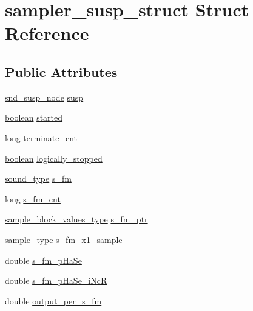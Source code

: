\hypertarget{structsampler__susp__struct}{}\section{sampler\+\_\+susp\+\_\+struct Struct Reference}
\label{structsampler__susp__struct}
\subsection*{Public Attributes}
\begin{DoxyCompactItemize}
\item 
\hyperlink{sound_8h_a6b268203688a934bd798ceb55f85d4c0}{snd\+\_\+susp\+\_\+node} \hyperlink{structsampler__susp__struct_aca12395994eb3e4a8d3e45013c46b4d1}{susp}
\item 
\hyperlink{cext_8h_a7670a4e8a07d9ebb00411948b0bbf86d}{boolean} \hyperlink{structsampler__susp__struct_a9e49593b1b9354e86921883a1e70de94}{started}
\item 
long \hyperlink{structsampler__susp__struct_a52700e7baeb9de79d9b283f96ec85a30}{terminate\+\_\+cnt}
\item 
\hyperlink{cext_8h_a7670a4e8a07d9ebb00411948b0bbf86d}{boolean} \hyperlink{structsampler__susp__struct_a71d994207abacdf2fe2829cfaf7068c7}{logically\+\_\+stopped}
\item 
\hyperlink{sound_8h_a792cec4ed9d6d636d342d9365ba265ea}{sound\+\_\+type} \hyperlink{structsampler__susp__struct_a5a21012cb28238120a79ac00dfa2d852}{s\+\_\+fm}
\item 
long \hyperlink{structsampler__susp__struct_abb84e22a7cd583230925b73d91b421f6}{s\+\_\+fm\+\_\+cnt}
\item 
\hyperlink{sound_8h_a83d17f7b465d1591f27cd28fc5eb8a03}{sample\+\_\+block\+\_\+values\+\_\+type} \hyperlink{structsampler__susp__struct_a0c1d7b5cf865835b5ba13cf6cd719864}{s\+\_\+fm\+\_\+ptr}
\item 
\hyperlink{sound_8h_a3a9d1d4a1c153390d2401a6e9f71b32c}{sample\+\_\+type} \hyperlink{structsampler__susp__struct_a3a531092b561bfec3efe51a6139ff602}{s\+\_\+fm\+\_\+x1\+\_\+sample}
\item 
double \hyperlink{structsampler__susp__struct_a4ac06bd5c8cd4672504ee0fc42138e99}{s\+\_\+fm\+\_\+p\+Ha\+Se}
\item 
double \hyperlink{structsampler__susp__struct_a81be99f2c9ff04d8408e018b3bea55f8}{s\+\_\+fm\+\_\+p\+Ha\+Se\+\_\+i\+NcR}
\item 
double \hyperlink{structsampler__susp__struct_a9e5d3473b0aff6e169325ef9071ad835}{output\+\_\+per\+\_\+s\+\_\+fm}

\end{DoxyCompactItemize}
